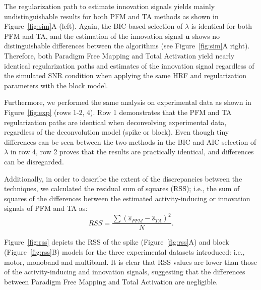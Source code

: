 The regularization path to estimate innovation signals yields mainly undistinguishable results for both PFM and TA methods as shown in Figure~\ref{fig:sim}A (left). Again, the BIC-based selection of \(\lambda\) is identical for both PFM and TA, and the estimation of the innovation signal \(\mathbf{u}\) shows no distinguishable differences between the algorithms (see Figure~\ref{fig:sim}A right). Therefore, both Paradigm Free Mapping and Total Activation yield nearly identical regularization paths and estimates of the innovation signal regardless of the simulated SNR condition when applying the same HRF and regularization parameters with the block model.

Furthermore, we performed the same analysis on experimental data as shown in Figure~\ref{fig:exp} (rows 1-2, 4). Row 1 demonstrates that the PFM and TA regularization paths are identical when deconvolving experimental data, regardless of the deconvolution model (spike or block). Even though tiny differences can be seen between the two methods in the BIC and AIC selection of \(\lambda\) in row 4, row 2 proves that the results are practically identical, and differences can be disregarded.

Additionally, in order to describe the extent of the discrepancies between the techniques, we calculated the residual sum of squares (RSS); i.e., the sum of squares of the differences between the estimated activity-inducing or innovation signals of PFM and TA as:
\begin{equation}
    RSS = \frac{\sum{(\hat{s}_{PFM} - \hat{s}_{TA})^2}}{N}.
\end{equation}

Figure~\ref{fig:rss} depicts the RSS of the spike (Figure~\ref{fig:rss}A) and block (Figure~\ref{fig:rss}B) models for the three experimental datasets introduced: i.e., motor, monoband and multiband. It is clear that RSS values are lower than those of the activity-inducing and innovation signals, suggesting that the differences between Paradigm Free Mapping and Total Activation are negligible.
